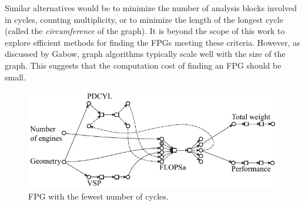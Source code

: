 	Similar alternatives would be to minimize the number of analysis blocks involved in cycles, counting multiplicity, or to minimize the length of the longest cycle (called the \emph{circumference} of the graph). It is beyond the scope of this work to explore efficient methods for finding the FPGs meeting these criteria. However, as discussed by Gabow\cite{Gabow1985}, graph algorithms typically scale well with the size of the graph. This suggests that the computation cost of finding an FPG should be small.
	\begin{figure}[htb!]
	  \begin{center}
		\includegraphics[width=4.5in]{images/FPG_edit_fewest_cycles}
	  \end{center}
	  \caption{FPG with the fewest number of cycles.}
	\label{f:FPG fewest cycles}
	\end{figure}

